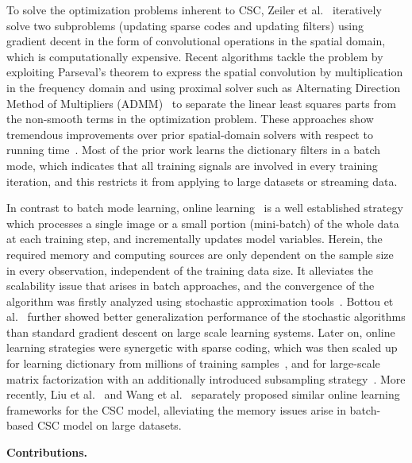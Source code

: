 To solve the optimization problems inherent to CSC, Zeiler et
al.~\cite{zeiler2010deconvolutional} iteratively solve two subproblems
(updating sparse codes and updating filters) using gradient decent in
the form of convolutional operations in the spatial domain, which is
computationally expensive. Recent algorithms tackle the problem by
exploiting Parseval's theorem to express the spatial convolution by
multiplication in the frequency domain and using proximal solver such
as Alternating Direction Method of Multipliers
(ADMM)~\cite{boyd2011distributed} to separate the linear least squares
parts from the non-smooth terms in the optimization
problem. These approaches show tremendous improvements over prior
spatial-domain solvers with respect to running
time~\cite{bristow2013fast,heide2015fast,wohlberg2016efficient,choudhury2017consensus}. Most
of the prior work learns the dictionary filters in a batch mode, which
indicates that all training signals are involved in every training
iteration, and this restricts it from applying to large datasets or
streaming data.

In contrast to batch mode learning, online
learning~\cite{shalev2012online} is a well established strategy which
processes a single image or a small portion (mini-batch) of the whole
data at each training step, and incrementally updates model
variables. Herein, the required memory and computing sources are only
dependent on the sample size in every observation, independent of the
training data size. It alleviates the scalability issue that arises in
batch approaches, and the convergence of the algorithm was firstly
analyzed using stochastic approximation
tools~\cite{bottou1998online}. Bottou et
al.~\cite{bousquet2008tradeoffs} further showed better generalization
performance of the stochastic algorithms than standard gradient
descent on large scale learning systems. Later on, online learning
strategies were synergetic with sparse coding, which was then scaled
up for learning dictionary from millions of training
samples~\cite{mairal2009online,mairal2010online}, and for large-scale
matrix factorization with an additionally introduced subsampling
strategy~\cite{mensch2016dictionary}. More recently, Liu et
al.~\cite{liu-2018-first} and Wang et al.~\cite{wang2018scalable}
separately proposed similar online learning frameworks for the CSC
model, alleviating the memory issues arise in batch-based CSC model on
large datasets.

{\bfseries Contributions.} 



